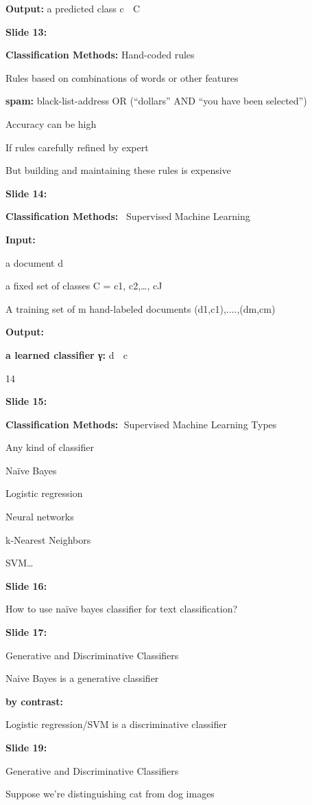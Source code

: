 \documentclass[11pt,a4paper]{article}
\begin{document}
\textbf{Output:}  a predicted class c  C

\textbf{Slide 13:}

\textbf{Classification Methods:}   Hand-coded rules

Rules based on combinations of words or other features

\textbf{spam:}  black-list-address OR (“dollars” AND “you have been selected”)

Accuracy can be high

If rules carefully refined by expert

But building and maintaining these rules is expensive

\textbf{Slide 14:}

\textbf{Classification Methods:}  Supervised Machine Learning

\textbf{Input:} 

a document d

a fixed set of classes  C = {c1, c2,…, cJ}

A training set of m hand-labeled documents (d1,c1),....,(dm,cm)

\textbf{Output:} 

\textbf{a learned classifier γ:} d  c

14

\textbf{Slide 15:}

\textbf{Classification Methods:} Supervised Machine Learning Types

Any kind of classifier

Naïve Bayes

Logistic regression

Neural networks

k-Nearest Neighbors

SVM…

\textbf{Slide 16:}

How to use naïve bayes classifier for text classification?

\textbf{Slide 17:}

Generative and Discriminative Classifiers

Naive Bayes is a generative classifier

\textbf{by contrast:} 

Logistic regression/SVM is a discriminative classifier

\textbf{Slide 19:}

Generative and Discriminative Classifiers

Suppose we're distinguishing cat from dog images
\end{document}
